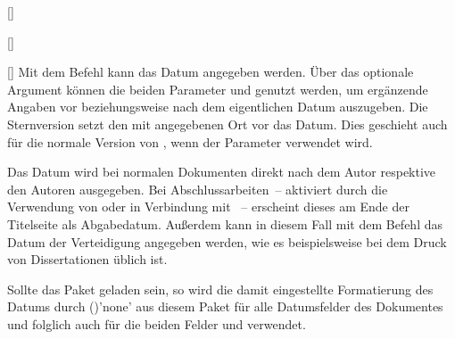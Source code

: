 \begin{Declaration*}{}
\begin{Declaration*}{}
\begin{Declaration*}{}
\begin{Declaration}{[]}
\begin{Declaration}[v2.05]{%
  []%
}
\begin{Declaration}[v2.05]{%
}
\begin{Declaration}[v2.05]{%
}
\begin{Declaration}[v2.05]{%
}
\begin{Declaration}{[]}
\printdeclarationlist%
%
%
%
%
Mit dem Befehl  kann das Datum angegeben werden. 
 Über das optionale Argument können die beiden Parameter 
 und  genutzt werden, um 
ergänzende Angaben vor beziehungsweise nach dem eigentlichen Datum auszugeben. 
Die Sternversion  setzt den mit  angegebenen Ort vor 
das Datum. Dies geschieht auch für die normale Version von , wenn 
der Parameter  verwendet wird.

Das Datum wird bei normalen Dokumenten direkt nach dem Autor respektive den 
Autoren ausgegeben. Bei Abschlussarbeiten~-- aktiviert durch die Verwendung von 
 oder  in Verbindung mit ~-- 
erscheint dieses am Ende der Titelseite als Abgabedatum. Außerdem kann in 
diesem Fall mit dem Befehl das Datum der Verteidigung 
angegeben werden, wie es beispielsweise bei dem Druck von Dissertationen üblich 
ist.

Sollte das Paket  geladen sein, so wird die damit eingestellte 
Formatierung des Datums durch ()'none' aus 
diesem Paket für alle Datumsfelder des Dokumentes und folglich auch für die 
beiden Felder  und  verwendet.
\end{Declaration}
\end{Declaration}
\end{Declaration}
\end{Declaration}
\end{Declaration}
\end{Declaration}


\end{Declaration*}
\end{Declaration*}
\end{Declaration*}
